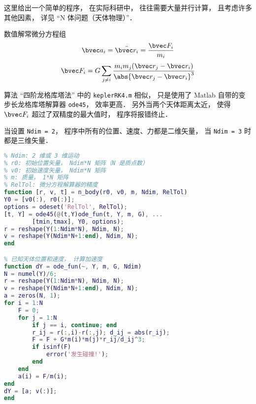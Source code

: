 
\begin{issues}
\issueDraft
\end{issues}


这里给出一个简单的程序， 在实际科研中， 往往需要大量并行计算， 且考虑许多其他因素， 详见 “N 体问题（天体物理）”．

数值解常微分方程组
\begin{equation}
\bvec a_i = \ddot{\bvec r_i} = \frac{\bvec F_i}{m_i}
\end{equation}
\begin{equation}
\bvec F_i = G\sum_{j\ne i} \frac{m_i m_j(\bvec r_j - \bvec r_i)}{\abs{\bvec r_j - \bvec r_i}^3}
\end{equation}

算法 “四阶龙格库塔法” 中的 \verb|keplerRK4.m| 相似， 只是使用了 Matlab 自带的变步长龙格库塔解算器 \verb|ode45|， 效率更高． 另外当两个天体距离太近， 使得 $\bvec F_i$ 超过了双精度的最大值时， 程序将报错终止．

当设置 \verb|Ndim = 2|， 程序中所有的位置、速度、力都是二维矢量， 当 \verb|Ndim = 3| 时都是三维矢量．


\begin{lstlisting}[language=matlab]
% N 体问题（支持二维或三维）
% Ndim: 2 维或 3 维运动
% r0: 初始位置矢量， Ndim*N 矩阵（N 是质点数）
% v0: 初始速度矢量， Ndim*N 矩阵
% m: 质量， 1*N 矩阵
% RelTol: 微分方程解算器的精度
function [r, v, t] = n_body(r0, v0, m, Ndim, RelTol)
Y0 = [v0(:), r0(:)];
options = odeset('RelTol', RelTol);
[t, Y] = ode45(@(t,Y)ode_fun(t, Y, m, G), ...
        [tmin,tmax], Y0, options);
r = reshape(Y(1:Ndim*N), Ndim, N);
v = reshape(Y(Ndim*N+1:end), Ndim, N);
end

% 已知天体位置和速度， 计算加速度
function dY = ode_fun(~, Y, m, G, Ndim)
N = numel(Y)/6;
r = reshape(Y(1:Ndim*N), Ndim, N);
v = reshape(Y(Ndim*N+1:end), Ndim, N);
a = zeros(N, 1);
for i = 1:N
    F = 0;
    for j = 1:N
        if j == i, continue; end
        r_ij = r(:,i)-r(:,j); d_ij = abs(r_ij);
        F = F + G*m(i)*m(j)*r_ij/d_ij^3;
        if isinf(F)
            error('发生碰撞!');
        end
    end
    a(i) = F/m(i);
end
dY = [a; v(:)];
end
\end{lstlisting}
